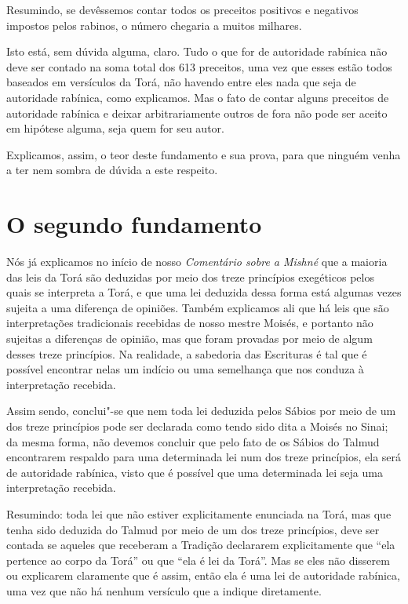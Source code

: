 Resumindo, se devêssemos contar todos os preceitos positivos e
negativos impostos pelos rabinos, o número chegaria a muitos milhares.

Isto está, sem dúvida alguma, claro. Tudo o que for de autoridade
rabínica não deve ser contado na soma total dos 613 preceitos, uma vez
que esses estão todos baseados em versículos da Torá\starr, não havendo entre
eles nada que seja de autoridade rabínica, como explicamos. Mas o fato
de contar alguns preceitos de autoridade rabínica e deixar
arbitrariamente outros de fora não pode ser aceito em hipótese alguma,
seja quem for seu autor.

Explicamos, assim, o teor deste fundamento e sua prova, para que ninguém
venha a ter nem sombra de dúvida a este respeito.

\chapter*{O segundo fundamento}

Nós já explicamos no início de nosso \emph{Comentário sobre a Mishné}
que a maioria das leis da Torá\starr{} são deduzidas por meio dos treze
princípios exegéticos pelos quais se interpreta a Torá\starr, e que uma lei
deduzida dessa forma está algumas vezes sujeita a uma diferença de
opiniões. Também explicamos ali que há leis que são interpretações
tradicionais recebidas de nosso mestre Moisés, e portanto não sujeitas
a diferenças de opinião, mas que foram provadas por meio de algum
desses treze princípios. Na realidade, a sabedoria das Escrituras é tal
que é possível encontrar nelas um indício ou uma semelhança que nos
conduza à interpretação recebida.

Assim sendo, conclui"-se que nem toda lei deduzida pelos Sábios por meio
de um dos treze princípios pode ser declarada como tendo sido dita a
Moisés no Sinai; da mesma forma, não devemos concluir que pelo fato de
os Sábios do Talmud\starr{} encontrarem respaldo para uma determinada lei num
dos treze princípios, ela será de autoridade rabínica, visto que é
possível que uma
determinada lei seja uma interpretação recebida.

Resumindo: toda lei que não estiver explicitamente enunciada na Torá\starr,
mas que tenha sido deduzida do Talmud\starr{} por meio de um dos treze
princípios, deve ser contada se aqueles que receberam a Tradição
declararem explicitamente que ``ela pertence ao corpo da Torá\starr'' ou que
``ela é lei da Torá\starr''. Mas se eles não disserem ou explicarem
claramente que é assim, então ela é uma lei de autoridade rabínica, uma
vez que não há nenhum versículo que a indique diretamente.

